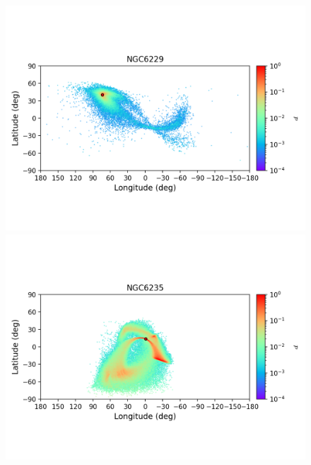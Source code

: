 \begin{figure}
\begin{center}
                \includegraphics[clip=true, trim = 0mm 20mm 0mm 10mm, width=1\columnwidth]{images/error_plots_NGC6229.png}
                \includegraphics[clip=true, trim = 0mm 20mm 0mm 10mm, width=1\columnwidth]{images/error_plots_NGC6235.png}
                

\end{center}
\end{figure}
